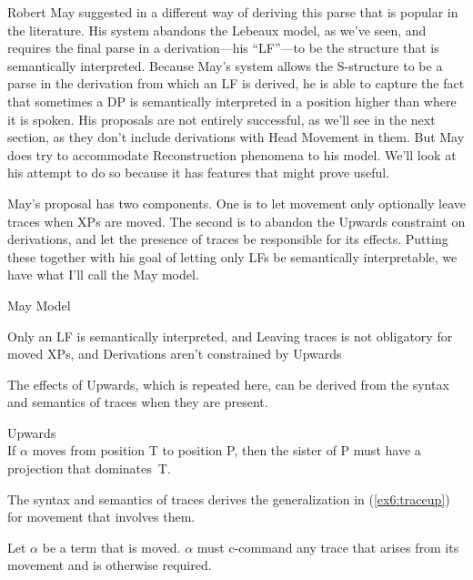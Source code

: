 Robert May suggested in \citet{May:1985} a different way of deriving this parse that is popular in the literature. His system abandons the Lebeaux model, as we've seen, and requires the final parse in a derivation---his ``LF''---to be the structure that is semantically interpreted. Because May's system allows the S-structure to be a parse in the derivation from which an LF is derived, he is able to capture the fact that sometimes a DP is semantically interpreted in a position higher than where it is spoken. His proposals are not entirely successful, as we'll see in the next section, as they don't include derivations with Head Movement in them. But May does try to accommodate Reconstruction phenomena to his model. We'll look at his attempt to do so because it has features that might prove useful.

May's proposal has two components. One is to let movement only optionally leave traces when XPs are moved. %
%
%
%
The second is to abandon the Upwards constraint on derivations, and let the presence of traces be responsible for its effects. Putting these together with his goal of letting only LFs be semantically interpretable, we have what I'll call the May model.
\pagebreak
\begin{exe}
\raggedright
	\ex \label{ex6:maymodel} May Model
	\begin{xlist}
		\ex Only an LF is semantically interpreted, and
		\ex Leaving traces is not obligatory for moved XPs, and
		\ex Derivations aren't constrained by Upwards
	\end{xlist}
\end{exe}
The effects of Upwards, which is repeated here, can be derived from the syntax and semantics of traces when they are present.%
% 
%
%
\begin{exe}
	\raggedright
	\ex \label{ex6:upwards} Upwards\\
	If $\alpha$ moves from position T to position P, then the sister of P must have a projection that dominates~T.
\end{exe}
The syntax and semantics of traces derives the generalization in (\ref{ex6:traceup}) for movement that involves them.
\begin{exe}
	\raggedright
		\ex \label{ex6:traceup}
		Let $\alpha$ be a term that is moved. $\alpha$ must c-command any trace that arises from its movement and is otherwise required.
\end{exe}
